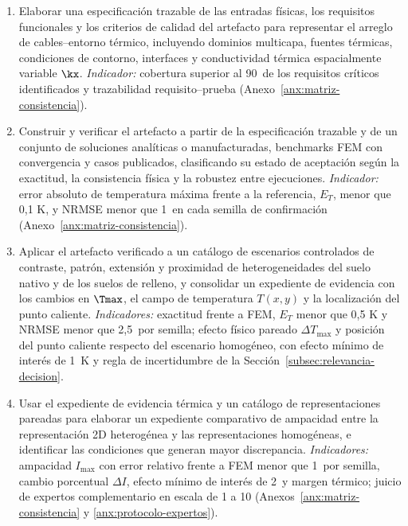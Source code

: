 \begin{enumerate}[label=OE\arabic*.]
  \item Elaborar una especificación trazable de las entradas físicas, los requisitos funcionales y los criterios de calidad del artefacto para representar el arreglo de cables--entorno térmico, incluyendo dominios multicapa, fuentes térmicas, condiciones de contorno, interfaces y conductividad térmica espacialmente variable $\kx$. \textit{Indicador:} cobertura superior al 90\,\pct{} de los requisitos críticos identificados y trazabilidad requisito--prueba (Anexo~\ref{anx:matriz-consistencia}).
  \item Construir y verificar el artefacto a partir de la especificación trazable y de un conjunto de soluciones analíticas o manufacturadas, benchmarks FEM con convergencia y casos publicados, clasificando su estado de aceptación según la exactitud, la consistencia física y la robustez entre ejecuciones. \textit{Indicador:} error absoluto de temperatura máxima frente a la referencia, $E_T$, menor que 0,1 K, y NRMSE menor que 1\,\pct{} en cada semilla de confirmación (Anexo~\ref{anx:matriz-consistencia}).
  \item Aplicar el artefacto verificado a un catálogo de escenarios controlados de contraste, patrón, extensión y proximidad de heterogeneidades del suelo nativo y de los suelos de relleno, y consolidar un expediente de evidencia con los cambios en $\Tmax$, el campo de temperatura $T(x,y)$ y la localización del punto caliente. \textit{Indicadores:} exactitud frente a FEM, $E_T$ menor que 0,5 K y NRMSE menor que 2,5\,\pct{} por semilla; efecto físico pareado $\Delta T_{\max}$ y posición del punto caliente respecto del escenario homogéneo, con efecto mínimo de interés de \SI{1}{\kelvin} y regla de incertidumbre de la Sección~\ref{subsec:relevancia-decision}.
  \item Usar el expediente de evidencia térmica y un catálogo de representaciones pareadas para elaborar un expediente comparativo de ampacidad entre la representación 2D heterogénea y las representaciones homogéneas, e identificar las condiciones que generan mayor discrepancia. \textit{Indicadores:} ampacidad $I_{\max}$ con error relativo frente a FEM menor que 1\,\pct{} por semilla, cambio porcentual $\Delta I$, efecto mínimo de interés de 2\,\pct{} y margen térmico; juicio de expertos complementario en escala de 1 a 10 (Anexos~\ref{anx:matriz-consistencia} y \ref{anx:protocolo-expertos}).
\end{enumerate}

